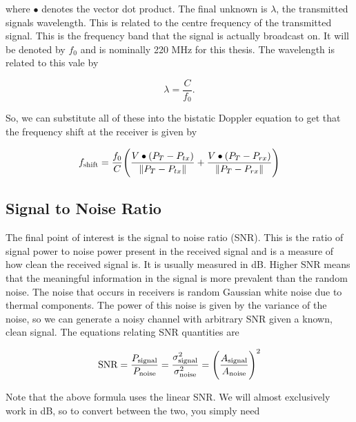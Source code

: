 \documentclass[12pt,openany,a4paper]{book}
\begin{document}
\bigskip

where $\bullet$ denotes the vector dot product. The final unknown is $\lambda$, the transmitted signals wavelength. This is related to the centre frequency of the transmitted signal. This is the frequency band that the signal is actually broadcast on. It will be denoted by $f_0$ and is nominally 220 MHz for this thesis. The wavelength is related to this vale by

\begin{equation}
\lambda = \frac{C}{f_0}.
\end{equation}

\bigskip

So, we can substitute all of these into the bistatic Doppler equation to get that the frequency shift at the receiver is given by

\begin{equation}
f_{\textnormal{shift}} = \frac{f_0}{C} \Bigg(\frac{V\bullet(P_T - P_{tx})}{\|P_T - P_{tx}\|} +  \frac{V\bullet(P_T - P_{rx})}{\|P_T - P_{rx}\|}\Bigg)
\end{equation}

\bigskip


\subsection{Signal to Noise Ratio}
\label{sec:snr}
The final point of interest is the signal to noise ratio (SNR). This is the ratio of signal power to noise power present in the received signal and is a measure of how clean the received signal is. It is usually measured in dB. Higher SNR means that the meaningful information in the signal is more prevalent than the random noise. The noise that occurs in receivers is random Gaussian white noise due to thermal components. The power of this noise is given by the variance of the noise, so we can generate a noisy channel with arbitrary SNR given a known, clean signal. The equations relating SNR quantities are

\begin{equation}
\textnormal{SNR} = \frac{P_{\textnormal{signal}}}{P_{\textnormal{noise}}} = \frac{\sigma_{\textnormal{signal}}^2}{\sigma_{\textnormal{noise}}^2} = \Bigg(\frac{A_{\textnormal{signal}}}{A_{\textnormal{noise}}} \Bigg)^2
\end{equation}

\bigskip

Note that the above formula uses the linear SNR. We will almost exclusively work in dB, so to convert between the two, you simply need
\end{document}
